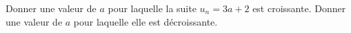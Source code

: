 
\begin{exercice}\label{exosmath-0160}

    Donner une valeur de \( a\) pour laquelle la suite \( u_n=3a+2\) est croissante. Donner une valeur de \( a\) pour laquelle elle est décroissante.

\end{exercice}
